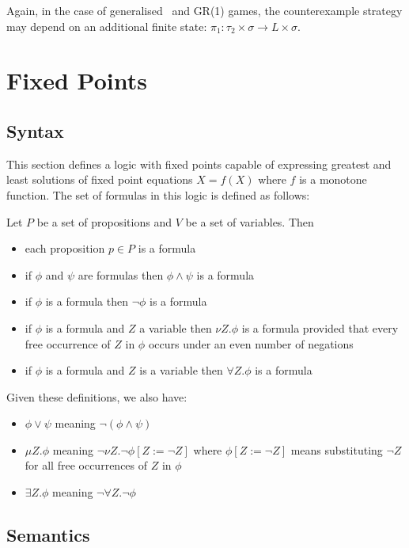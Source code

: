 Again, in the case of generalised \buchi\ and GR(1) games, the counterexample strategy may depend on an additional finite state: $\pi_1 : \tau_2 \times \sigma \rightarrow L \times \sigma$.



\section{Fixed Points}
\label{sec:fixed_points}

\subsection{Syntax}

This section defines a logic with fixed points capable of expressing greatest and least solutions of fixed point equations $X = f(X)$ where $f$ is a monotone function. The set of formulas in this logic is defined as follows:

Let $P$ be a set of propositions and $V$ be a set of variables. Then

\begin{itemize}
    \item each proposition $p \in P$ is a formula
    \item if $\phi$ and $\psi$ are formulas then $\phi \wedge \psi$ is a formula
    \item if $\phi$ is a formula then $\neg \phi$ is a formula
    \item if $\phi$ is a formula and $Z$ a variable then $\nu Z.\phi$ is a formula provided that every free occurrence of $Z$ in $\phi$ occurs under an even number of negations
    \item if $\phi$ is a formula and $Z$ is a variable then $\forall Z. \phi$ is a formula
\end{itemize}

\noindent Given these definitions, we also have:
\begin{itemize}
    \item $\phi \vee \psi$ meaning $\neg (\phi \wedge \psi)$
    \item $\mu Z. \phi$ meaning $\neg \nu Z. \neg \phi [Z := \neg Z]$ where $\phi[Z := \neg Z]$ means substituting $\neg Z$ for all free occurrences of $Z$ in $\phi$
    \item $\exists Z. \phi$ meaning $\neg \forall Z. \neg \phi$
\end{itemize}

\subsection{Semantics}
\label{sec:musem}

